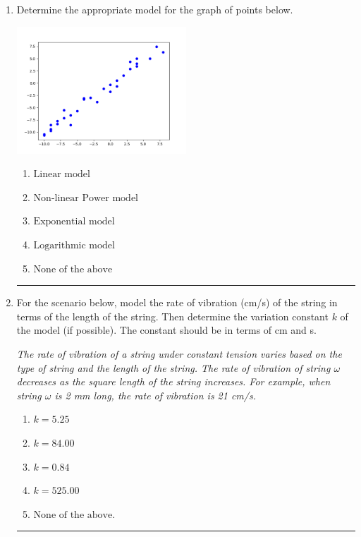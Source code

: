 \documentclass[14pt]{extbook}
\newcommand{\litem}[1]{\item#1\hspace*{-1cm}\rule{\textwidth}{0.4pt}}
\begin{document}
\begin{enumerate}
{\begin{enumerate}[label=\Alph*.]
\end{enumerate} }
\litem{
Determine the appropriate model for the graph of points below.
\begin{center}
    \includegraphics[width=0.5\textwidth]{../Figures/identifyModelGraph12B.png}
\end{center}
\begin{enumerate}[label=\Alph*.]
\item \( \text{Linear model} \)
\item \( \text{Non-linear Power model} \)
\item \( \text{Exponential model} \)
\item \( \text{Logarithmic model} \)
\item \( \text{None of the above} \)

\end{enumerate} }
\litem{
For the scenario below, model the rate of vibration (cm/s) of the string in terms of the length of the string. Then determine the variation constant $k$ of the model (if possible). The constant should be in terms of cm and s.
\begin{center}
    \textit{ The rate of vibration of a string under constant tension varies based on the type of string and the length of the string. The rate of vibration of string $\omega$ decreases as the square length of the string increases. For example, when string $\omega$ is 2 mm long, the rate of vibration is 21 cm/s. }
\end{center}
\begin{enumerate}[label=\Alph*.]
\item \( k = 5.25 \)
\item \( k = 84.00 \)
\item \( k = 0.84 \)
\item \( k = 525.00 \)
\item \( \text{None of the above.} \)


\end{enumerate}}
\end{enumerate}
\end{document}
